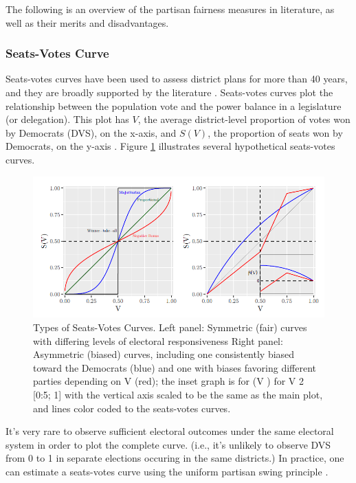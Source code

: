 The following is an overview of the partisan fairness measures in literature, as well as their merits and disadvantages. 

\subsubsection{Seats-Votes Curve}

Seats-votes curves have been used to assess district plans for more than 40 years, and they are broadly supported by the literature \parencite{katz2020}. Seats-votes curves plot the relationship between the population vote and the power balance in a legislature (or delegation). This plot has $V$, the average district-level proportion of votes won by Democrats (DVS), on the x-axis, and $S(V)$, the proportion of seats won by Democrats, on the y-axis \parencite{tufte1973}. Figure \ref{fig:seatsvotes1} illustrates several hypothetical seats-votes curves.

\begin{figure}
    \centering
    \includegraphics[width=0.8\linewidth]{img/seatsvotes.png}
    \caption{Types of Seats-Votes Curves. Left panel: Symmetric (fair) curves with differing levels of electoral responsiveness Right panel: Asymmetric (biased) curves, including one consistently biased toward the Democrats (blue) and one with biases favoring different parties depending on V (red); the inset graph is for (V ) for V 2 [0:5; 1] with the vertical axis scaled to be the same as the main plot, and lines color coded to the seats-votes curves. \parencite[175]{katz2020}}
    \label{fig:seatsvotes1}
\end{figure}

It's very rare to observe sufficient electoral outcomes under the same electoral system in order to plot the complete curve. (i.e., it's unlikely to observe DVS from 0 to 1 in separate elections occuring in the same districts.) In practice, one can estimate a seats-votes curve using the uniform partisan swing principle \parencite{tufte1973}.

